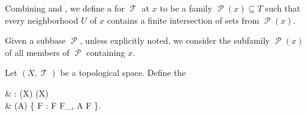 \begin{definition}\label{def:topological_local_subbase}
  Combining  and , we define a  for \( \mscrT \) at \( x \) to be a family \( \mscrP(x) \subseteq T \) such that every neighborhood \( U \) of \( x \) contains a finite intersection of sets from \( \mscrP(x) \).

  Given a subbase \( \mscrP \), unless explicitly noted, we consider the subfamily \( \mscrP(x) \) of all members of \( \mscrP \) containing \( x \).
\end{definition}

\begin{definition}\label{def:topological_closure_operator}
  Let \( (X, \mscrT) \) be a topological space. Define the 
  \begin{balign*}
     & \cl: \pow(X) \to \pow(X)                                           \\
     & \cl(A) \coloneqq \bigcap \{ F : F \in F_\mscrT, A \subseteq F \}.
  \end{balign*}
\end{definition}

